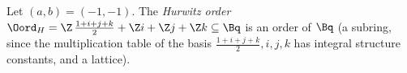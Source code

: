 Let $(a,b)=(-1,-1)$. The \emph{Hurwitz order} $\Oord_H=\Z\,\tfrac{1+i+j+k}2+\Z i+\Z j+\Z k\subseteq\Bq$ is an order of $\Bq$ (a subring, since the
multiplication table of the basis $\tfrac{1+i+j+k}2,i,j,k$ has integral structure constants, and a lattice).
